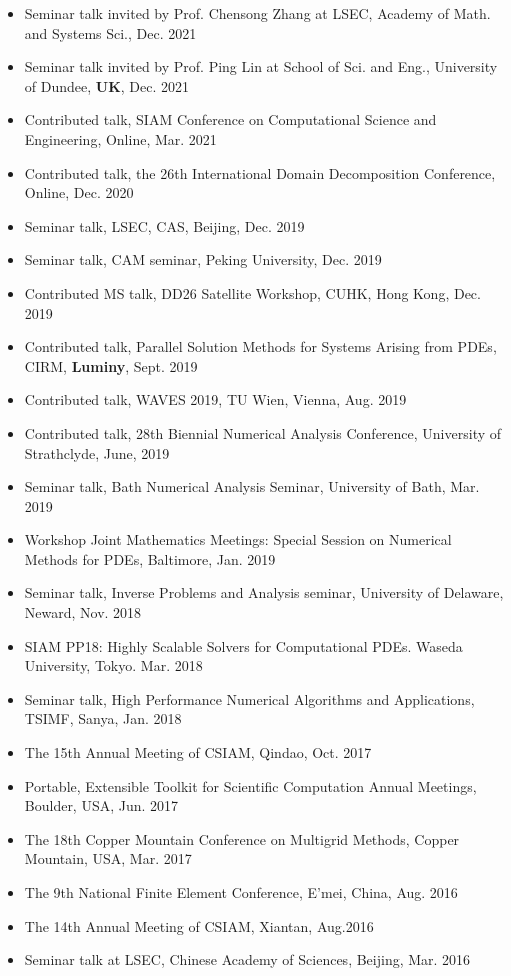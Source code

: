 \documentclass[letterpaper]{article}
\begin{document}
\begin{itemize}[leftmargin=*]
\item Seminar talk invited by Prof. Chensong Zhang at LSEC, Academy of Math. and Systems Sci., Dec. 2021
\item  Seminar talk invited by Prof. Ping Lin at School of Sci. and Eng., University of Dundee, {\bf UK}, Dec. 2021
\item Contributed talk, SIAM Conference on Computational Science and Engineering, Online, Mar. 2021
\item Contributed talk, the 26th International Domain Decomposition Conference, Online, Dec. 2020
\item Seminar talk, LSEC, CAS, Beijing, Dec. 2019
\item Seminar talk, CAM seminar, Peking University, Dec. 2019
\item Contributed MS talk, DD26 Satellite Workshop, CUHK, Hong Kong, Dec. 2019 
\item Contributed talk, Parallel Solution Methods for Systems Arising from PDEs, CIRM, {\bf Luminy}, Sept. 2019
\item Contributed talk, WAVES 2019, TU Wien, Vienna, Aug. 2019
\item Contributed talk, 28th Biennial Numerical Analysis Conference, University of Strathclyde, June, 2019
\item Seminar  talk, Bath Numerical Analysis Seminar, University of Bath, Mar. 2019
\item Workshop Joint Mathematics Meetings: Special Session on Numerical Methods for PDEs,  Baltimore, Jan. 2019
\item Seminar talk, Inverse Problems and Analysis seminar, University of Delaware, Neward, Nov. 2018
\item SIAM  PP18: Highly Scalable Solvers for Computational PDEs. Waseda University, Tokyo. Mar. 2018
\item Seminar talk, High Performance Numerical Algorithms and Applications, TSIMF, Sanya, Jan. 2018
\item The 15th Annual Meeting of CSIAM, Qindao, Oct. 2017
\item Portable, Extensible Toolkit for Scientific Computation Annual Meetings, Boulder, USA, Jun. 2017
\item The 18th Copper Mountain Conference on Multigrid Methods, Copper Mountain, USA, Mar. 2017
\item The 9th National Finite Element Conference, E'mei, China, Aug. 2016
\item The 14th Annual Meeting of CSIAM, Xiantan, Aug.2016
\item Seminar talk at LSEC, Chinese Academy of Sciences, Beijing, Mar. 2016

\end{itemize}
\end{document}
